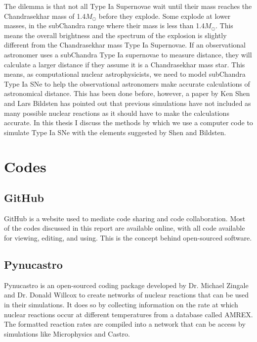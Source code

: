 \documentclass[11pt, oneside]{article}   	%
\begin{document}
  The dilemma is that not all Type Ia Supernovae wait until their mass reaches  the Chandrasekhar mass of 1.4$M_{\odot}$ before they explode. Some explode at lower masses, in the subChandra range where their mass is less than 1.4$M_{\odot}$. This means the overall brightness and the spectrum of the explosion is slightly different from the Chandrasekhar mass Type Ia Supernovae. If an observational astronomer uses a subChandra Type Ia supernovae to measure distance, they will calculate a larger distance if they assume it is a Chandrasekhar mass star. This means, as computational nuclear astrophysicists, we need to model subChandra Type Ia SNe to help the observational astronomers make accurate calculations of astronomical distance. This has been done before, however, a paper by Ken Shen and Lars Bildsten has pointed out that previous simulations have not included as many possible nuclear reactions as it should have to make the calculations accurate. In this thesis I discuss the methods by which we use a computer code to simulate Type Ia SNe with the elements suggested by Shen and Bildsten. 

\section{Codes}

  \subsection{GitHub}
  	
    GitHub is a website used to mediate code sharing and code collaboration. Most of the codes discussed in this report are available online, with all code available for viewing, editing, and using. This is the concept behind open-sourced software. 

  \subsection{Pynucastro}
    
    Pynucastro is an open-sourced coding package developed by Dr. Michael Zingale and Dr. Donald Willcox to create networks of nuclear reactions that can be used in their simulations. %
    It does so by collecting information on the rate at which nuclear reactions occur at different temperatures from a database called AMREX. The formatted reaction rates are compiled into a network that can be access by simulations like Microphysics and Castro. 
  
\end{document}

